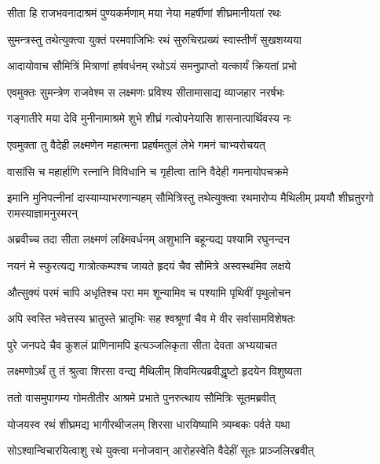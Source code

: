 \twolineshloka
{सीता हि राजभवनादाश्रमं पुण्यकर्मणाम्}
{मया नेया महर्षीणां शीघ्रमानीयतां रथः} %

\twolineshloka
{सुमन्त्रस्तु तथेत्युक्त्वा युक्तं परमवाजिभिः}
{रथं सुरुचिरप्रख्यं स्वास्तीर्णं सुखशय्यया} %

\twolineshloka
{आदायोवाच सौमित्रिं मित्राणां हर्षवर्धनम्}
{रथोऽयं समनुप्राप्तो यत्कार्यं क्रियतां प्रभो} %

\twolineshloka
{एवमुक्तः सुमन्त्रेण राजवेश्म स लक्ष्मणः}
{प्रविश्य सीतामासाद्य व्याजहार नरर्षभः} %

\twolineshloka
{गङ्गातीरे मया देवि मुनीनामाश्रमे शुभे}
{शीघ्रं गत्वोपनेयासि शासनात्पार्थिवस्य नः} %

\twolineshloka
{एवमुक्ता तु वैदेही लक्ष्मणेन महात्मना}
{प्रहर्षमतुलं लेभे गमनं चाभ्यरोचयत्} %

\twolineshloka
{वासांसि च महार्हाणि रत्नानि विविधानि च}
{गृहीत्वा तानि वैदेही गमनायोपचक्रमे} %

\threelineshloka
{इमानि मुनिपत्नीनां दास्याम्याभरणान्यहम्}
{सौमित्रिस्तु तथेत्युक्त्वा रथमारोप्य मैथिलीम्}
{प्रययौ शीघ्रतुरगो रामस्याज्ञामनुस्मरन्} %

\twolineshloka
{अब्रवीच्च तदा सीता लक्ष्मणं लक्ष्मिवर्धनम्}
{अशुभानि बहून्यद्य पश्यामि रघुनन्दन} %

\twolineshloka
{नयनं मे स्फुरत्यद्य गात्रोत्कम्पश्च जायते}
{हृदयं चैव सौमित्रे अस्वस्थमिव लक्षये} %

\twolineshloka
{औत्सुक्यं परमं चापि अधृतिश्च परा मम}
{शून्यामिव च पश्यामि पृथिवीं पृथुलोचन} %

\twolineshloka
{अपि स्वस्ति भवेत्तस्य भ्रातुस्ते भ्रातृभिः सह}
{श्वश्रूणां चैव मे वीर सर्वासामविशेषतः} %

\twolineshloka
{पुरे जनपदे चैव कुशलं प्राणिनामपि}
{इत्यञ्जलिकृता सीता देवता अभ्ययाचत} %

\twolineshloka
{लक्ष्मणोऽर्थं तु तं श्रुत्वा शिरसा वन्द्य मैथिलीम्}
{शिवमित्यब्रवीद्धृष्टो हृदयेन विशुष्यता} %

\twolineshloka
{ततो वासमुपागम्य गोमतीतीर आश्रमे}
{प्रभाते पुनरुत्थाय सौमित्रिः सूतमब्रवीत्} %

\twolineshloka
{योजयस्व रथं शीघ्रमद्य भागीरथीजलम्}
{शिरसा धारयिष्यामि त्र्यम्बकः पर्वते यथा} %

\twolineshloka
{सोऽश्वान्विचारयित्वाशु रथे युक्त्वा मनोजवान्}
{आरोहस्वेति वैदेहीं सूतः प्राञ्जलिरब्रवीत्} %

